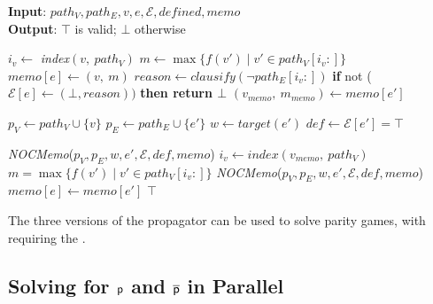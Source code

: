 \documentclass[runningheads]{llncs}
\begin{document}
\begin{algorithm}[htb]
\caption{\textbf{\textit{NOCMemo}}}
\small
\textbf{Input}: $path_V, path_E, v, e, \mathcal{E}, \textit{defined}, \textit{memo}$ \\
\textbf{Output}: $\top$ is valid; $\bot$ otherwise
\begin{algorithmic}[1]
        \STATE $i_v \gets$ \textit{index}$(v,\ path_V)$
        \STATE $m \gets \max\{f(v') \mid v' \in path_V[i_v:]\}$
        \STATE $\textit{memo}[e] \gets (v,\ m)$ \label{alg:noc-memo:update}
            \STATE $\textit{reason} \gets \textit{clausify}(\neg path_E[i_v:])$
            \STATE \textbf{if }not ($\mathcal{E}[e] \gets (\bot, \textit{reason}))$ \textbf{then return $\bot$}
        \ENDIF
            \STATE $(v_{memo},\ m_{memo}) \gets \textit{memo}[e']$

            \STATE $p_V \gets path_V \cup \{v\}$
            \STATE $p_E \gets path_E \cup \{e'\}$
            \STATE $w \gets \textit{target}(e')$
            \STATE $\textit{def} \gets \mathcal{E}[e'] = \top$

                \STATE \textit{NOCMemo}($p_V, p_E, w, e', \mathcal{E}, def , \textit{memo}$)\label{alg:noc-memo:check1}
            \ELSE
                \STATE $i_v \gets \textit{index}(v_{memo},\ path_V)$
                \STATE $m = \max\{f(v') \mid v' \in path_V[i_v:]\}$
                    \STATE \textit{NOCMemo}($p_V, p_E, w, e', \mathcal{E}, def , \textit{memo}$)\label{alg:noc-memo:check2}
                \ELSE
                    \STATE $\textit{memo}[e] \gets \textit{memo}[e']$
                \ENDIF
            \ENDIF
        \ENDFOR
    \ENDIF
    \RETURN $\top$
\end{algorithmic}
\label{alg:noc-memo}
\end{algorithm}

The three versions of the \noc propagator can be used to solve parity games, with \nocmemo requiring the \nocchecker.

\subsection{Solving for $\mathsf{p}$ and $\overline{\mathsf{p}}$ in Parallel}
\end{document}
